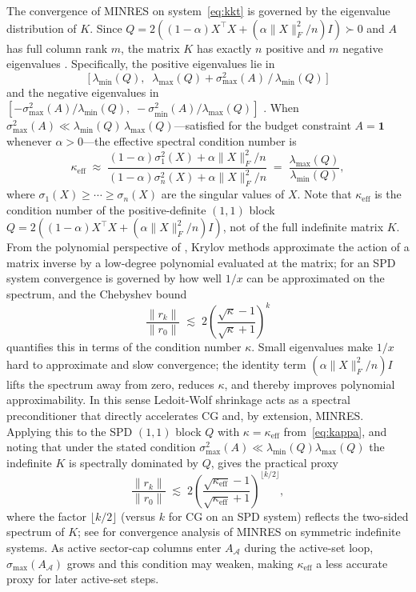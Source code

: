 \documentclass{siam/siamart}
\begin{document}
The convergence of MINRES on system~\eqref{eq:kkt} is governed by the eigenvalue
distribution of $K$.  Since $Q = 2((1-\alpha)X^\top X + (\alpha\|X\|_F^2/n)I) \succ 0$ and $A$ has full column
rank $m$, the matrix $K$ has exactly $n$ positive and $m$ negative eigenvalues
\cite{benzi2005}.  Specifically, the positive eigenvalues lie in
\[
  \bigl[\,\lambda_{\min}(Q),\;\;
         \lambda_{\max}(Q) + \sigma_{\max}^2(A)\,/\,\lambda_{\min}(Q)\,\bigr]
\]
and the negative eigenvalues in $[-\sigma_{\max}^2(A)/\lambda_{\min}(Q),\;
-\sigma_{\min}^2(A)/\lambda_{\max}(Q)]$ \cite{benzi2005}.  When
$\sigma_{\max}^2(A) \ll \lambda_{\min}(Q)\,\lambda_{\max}(Q)$---satisfied for the
budget constraint $A = \mathbf{1}$ whenever $\alpha > 0$---the effective spectral
condition number is
\begin{equation}\label{eq:kappa}
  \kappa_{\mathrm{eff}} \;\approx\;
  \frac{(1-\alpha)\sigma_1^2(X) + \alpha\|X\|_F^2/n}{(1-\alpha)\sigma_n^2(X) + \alpha\|X\|_F^2/n}
  \;=\; \frac{\lambda_{\max}(Q)}{\lambda_{\min}(Q)},
\end{equation}
where $\sigma_1(X) \geq \cdots \geq \sigma_n(X)$ are the singular values of $X$.
Note that $\kappa_{\mathrm{eff}}$ is the condition number of the positive-definite
$(1,1)$ block $Q = 2((1-\alpha)X^\top X + (\alpha\|X\|_F^2/n)I)$, not of the full indefinite matrix $K$.
From the polynomial perspective of \cite{fischer1996}, Krylov methods approximate
the action of a matrix inverse by a low-degree polynomial evaluated at the matrix;
for an SPD system convergence is governed by how well $1/x$ can be approximated on
the spectrum, and the Chebyshev bound \cite{golub2013,fischer1996}
\begin{equation}\label{eq:minres_conv}
\frac{\|r_k\|}{\|r_0\|} \;\lesssim\; 2\!\left(\frac{\sqrt{\kappa}-1}{\sqrt{\kappa}+1}\right)^{k}
\end{equation}
quantifies this in terms of the condition number $\kappa$.  Small eigenvalues make
$1/x$ hard to approximate and slow convergence; the identity term $(\alpha\|X\|_F^2/n)I$
lifts the spectrum away from zero, reduces $\kappa$, and thereby improves polynomial
approximability.  In this sense Ledoit-Wolf shrinkage acts as a spectral
preconditioner that directly accelerates CG and, by extension, MINRES.
Applying this to the SPD $(1,1)$ block $Q$ with $\kappa = \kappa_{\mathrm{eff}}$
from~\eqref{eq:kappa}, and noting that under the stated condition
$\sigma_{\max}^2(A) \ll \lambda_{\min}(Q)\lambda_{\max}(Q)$ the indefinite $K$ is
spectrally dominated by $Q$, gives the practical proxy
\begin{equation}\label{eq:minres_conv_proxy}
\frac{\|r_k\|}{\|r_0\|} \;\lesssim\; 2\!\left(\frac{\sqrt{\kappa_{\mathrm{eff}}}-1}{\sqrt{\kappa_{\mathrm{eff}}}+1}\right)^{\!\lfloor k/2\rfloor},
\end{equation}
where the factor $\lfloor k/2 \rfloor$ (versus $k$ for CG on an SPD system) reflects
the two-sided spectrum of $K$; see \cite{greenbaum1997,choi2006} for convergence
analysis of MINRES on symmetric indefinite systems.
As active sector-cap columns enter $A_{\mathcal{A}}$ during the active-set loop,
$\sigma_{\max}(A_{\mathcal{A}})$ grows and this condition may weaken, making
$\kappa_{\mathrm{eff}}$ a less accurate proxy for later active-set steps.
\end{document}
